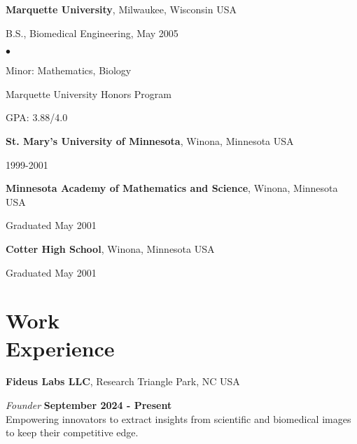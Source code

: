\documentclass[margin,line]{res}
\newenvironment{list1}{
  \begin{list}{\ding{113}}{%
      \setlength{\itemsep}{0in}
      \setlength{\parsep}{0in} \setlength{\parskip}{0in}
      \setlength{\topsep}{0in} \setlength{\partopsep}{0in}
      \setlength{\leftmargin}{0.17in}}}{\end{list}}
\newenvironment{list2}{
  \begin{list}{$\bullet$}{%
      \setlength{\itemsep}{0in}
      \setlength{\parsep}{0in} \setlength{\parskip}{0in}
      \setlength{\topsep}{0in} \setlength{\partopsep}{0in}
      \setlength{\leftmargin}{0.2in}}}{\end{list}}
\begin{document}
\begin{resume}
{\bf Marquette University}, Milwaukee, Wisconsin USA\\
\vspace*{-.1in}
\begin{list1}
\item[] B.S., Biomedical Engineering, May 2005

\begin{list2}
 \vspace*{.05in}
 \item Minor: Mathematics, Biology
 \item Marquette University Honors Program
 \item GPA: 3.88/4.0
\end{list2}
\end{list1}

{\bf St. Mary's University of Minnesota}, Winona, Minnesota USA\\
\vspace*{-.1in}
\begin{list1}
\item[] 1999-2001
\end{list1}


{\bf Minnesota Academy of Mathematics and Science}, Winona, Minnesota USA\\
\vspace*{-.1in}
\begin{list1}
\item[] Graduated May 2001
\end{list1}

{\bf Cotter High School}, Winona, Minnesota USA\\
\vspace*{-.1in}
\begin{list1}
\item[] Graduated May 2001
\end{list1}

\section{\sc Work\\ Experience}

{\bf Fideus Labs LLC}, Research Triangle Park, NC USA

\vspace{-.3cm}
{\em Founder} \hfill {\bf September 2024 - Present} \\
Empowering innovators to extract insights from scientific and biomedical
images to keep their competitive edge.


\end{resume}
\end{document}
